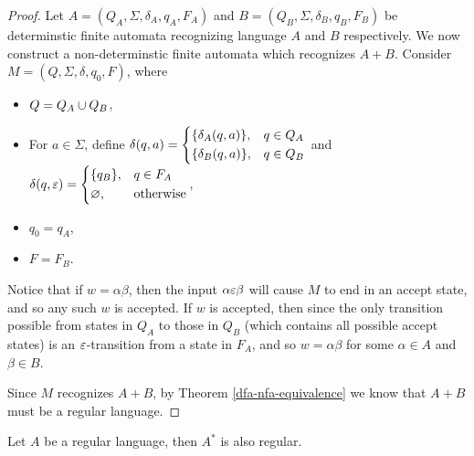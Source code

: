 \begin{proof}
    Let $A = (Q_A, \Sigma, \delta_A, q_A, F_A)$ and $B = (Q_B, \Sigma, \delta_B, q_B, F_B)$ be determinstic finite automata recognizing language $A$ and $B$ respectively. We now construct a non-determinstic finite automata which recognizes $A + B$. Consider $M = \left(Q, \Sigma, \delta, q_0, F\right)$, where
    \begin{itemize}
        \item $Q = Q_A \cup Q_B$,
        \item For $a \in \Sigma$, define $\delta(q, a) = \begin{dcases}
            \{\delta_A(q, a)\}, &q \in Q_A \\
            \{\delta_B(q, a)\}, &q \in Q_B \\
        \end{dcases}$ and $\delta(q, \varepsilon) = \begin{dcases}
            \{q_B\}, &q \in F_A \\
            \varnothing, &\textrm{otherwise} \\
        \end{dcases}$,
        \item $q_0 = q_A$,
        \item $F = F_B$.
    \end{itemize}
    Notice that if $w = \alpha\beta$, then the input $\alpha\varepsilon\beta$ will cause $M$ to end in an accept state, and so any such $w$ is accepted. If $w$ is accepted, then since the only transition possible from states in $Q_A$ to those in $Q_B$ (which contains all possible accept states) is an $\varepsilon$-transition from a state in $F_A$, and so $w = \alpha\beta$ for some $\alpha \in A$ and $\beta \in B$.

    Since $M$ recognizes $A + B$, by Theorem \ref{dfa-nfa-equivalence} we know that $A + B$ must be a regular language.
\end{proof}

\begin{thm}\label{regular-language-kleene-star}
    Let $A$ be a regular language, then $A^{*}$ is also regular.
\end{thm}

